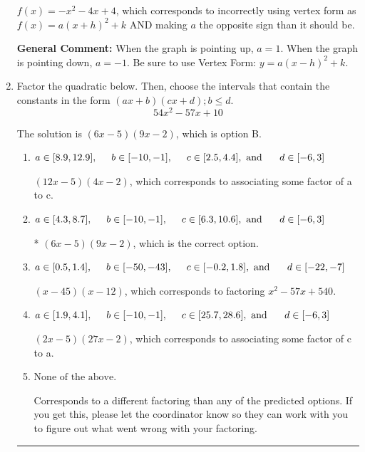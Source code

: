 \documentclass{extbook}[14pt]
\newcommand{\litem}[1]{\item #1

\rule{\textwidth}{0.4pt}}
\begin{document}
\begin{enumerate}
{\begin{enumerate}[label=\Alph*.]
$f(x)=-x^{2} -4 x + 4$, which corresponds to incorrectly using vertex form as $f(x) = a(x+h)^2+k$ AND making $a$ the opposite sign than it should be.
\end{enumerate}

\textbf{General Comment:} When the graph is pointing up, $a=1$. When the graph is pointing down, $a=-1$. Be sure to use Vertex Form: $y = a(x-h)^2+k$.
}
\litem{
Factor the quadratic below. Then, choose the intervals that contain the constants in the form $(ax+b)(cx+d); b \leq d.$
\[ 54x^{2} -57 x + 10 \]

The solution is \( (6x -5)(9x -2) \), which is option B.\begin{enumerate}[label=\Alph*.]
\item \( a \in [8.9, 12.9], \hspace*{5mm} b \in [-10, -1], \hspace*{5mm} c \in [2.5, 4.4], \text{ and } \hspace*{5mm} d \in [-6, 3] \)

 $(12x -5)(4x -2)$, which corresponds to associating some factor of a to c.
\item \( a \in [4.3, 8.7], \hspace*{5mm} b \in [-10, -1], \hspace*{5mm} c \in [6.3, 10.6], \text{ and } \hspace*{5mm} d \in [-6, 3] \)

* $(6x -5)(9x -2)$, which is the correct option.
\item \( a \in [0.5, 1.4], \hspace*{5mm} b \in [-50, -43], \hspace*{5mm} c \in [-0.2, 1.8], \text{ and } \hspace*{5mm} d \in [-22, -7] \)

 $(x -45)(x -12)$, which corresponds to factoring $x^{2} -57 x + 540$.
\item \( a \in [1.9, 4.1], \hspace*{5mm} b \in [-10, -1], \hspace*{5mm} c \in [25.7, 28.6], \text{ and } \hspace*{5mm} d \in [-6, 3] \)

 $(2x -5)(27x -2)$, which corresponds to associating some factor of c to a.
\item \( \text{None of the above.} \)

 Corresponds to a different factoring than any of the predicted options. If you get this, please let the coordinator know so they can work with you to figure out what went wrong with your factoring.
\end{enumerate}

}
\end{enumerate}
\end{document}
